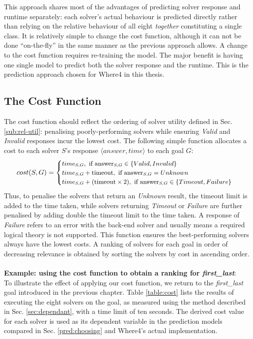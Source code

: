 This approach shares most of the advantages of predicting solver response and runtime separately: each solver's actual behaviour is predicted directly rather than relying on the relative behaviour of all eight \textit{together} constituting a single class. 
It is relatively simple to change the cost function, although it can not be done ``on-the-fly'' in the same manner as the previous approach allows.
A change to the cost function requires re-training the model.
The major benefit is having one single model to predict both the solver response and the runtime. 
This is the prediction approach chosen for \textsf{Where4} in this thesis.  

\subsection{The Cost Function}
\label{sub:scoring}

The cost function should reflect the ordering of solver utility defined in Sec. \ref{sub:rel-util}: penalising poorly-performing solvers while ensuring \textit{Valid} and \textit{Invalid} responses incur the lowest cost.
The following simple function allocates a cost to each solver $S$'s response $\langle answer, time\rangle$ to each goal $G$:
\[\small
cost(S,G) = 
\begin{cases}
time_{S,G}, \text{ if answer}_{S,G} \in \lbrace Valid, Invalid \rbrace \\
time_{S,G} + \text{timeout}, \text{ if answer}_{S,G} = Unknown \\
time_{S,G} + (\text{timeout} \times 2), \text{ if answer}_{S,G} \in \lbrace Timeout, Failure \rbrace
\end{cases}
\]
Thus, to penalise the solvers that return an \textit{Unknown} result, the timeout limit is added to the time taken, while solvers returning \textit{Timeout} or \textit{Failure} are further penalised by 
adding double the timeout limit to the time taken.
A response of \textit{Failure} refers to an error with the back-end solver and usually means a required logical theory is not supported. 
This function ensures the best-performing solvers always have the lowest costs. A ranking of solvers for each goal in order of decreasing relevance is obtained by sorting the solvers by cost in ascending order.\\ 
\\
\textbf{Example: using the cost function to obtain a ranking for \textit{first\_last}}: \\
To illustrate the effect of applying our cost function, we return to the \textit{first\_last} goal introduced in the previous chapter.
Table \ref{table:cost} lists the results of executing the eight solvers on the goal, as measured using the method described in Sec. \ref{sec:dependant}, with a time limit of ten seconds. 
The derived cost value for each solver is used as its dependent variable in the prediction models compared in Sec. \ref{pred:choosing} and \textsf{Where4}'s actual implementation.


